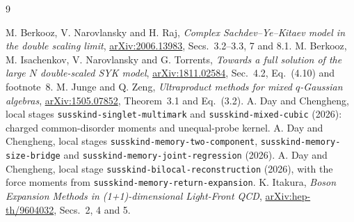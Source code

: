 \documentclass[11pt]{article}
\begin{document}
\begin{thebibliography}{9}\small\raggedright
{} M. Berkooz, V. Narovlansky and H. Raj,
\emph{Complex Sachdev--Ye--Kitaev model in the double scaling limit},
\href{https://arxiv.org/abs/2006.13983}{arXiv:2006.13983},
Secs.~3.2--3.3, 7 and 8.1.
 M. Berkooz, M. Isachenkov, V. Narovlansky and G. Torrents,
\emph{Towards a full solution of the large $N$ double-scaled SYK model},
\href{https://arxiv.org/abs/1811.02584}{arXiv:1811.02584},
Sec.~4.2, Eq.~(4.10) and footnote~8.
 M. Junge and Q. Zeng,
\emph{Ultraproduct methods for mixed $q$-Gaussian algebras},
\href{https://arxiv.org/abs/1505.07852}{arXiv:1505.07852},
Theorem~3.1 and Eq.~(3.2).
 A. Day and Chengheng, local stages
\texttt{susskind-singlet-multimark} and \texttt{susskind-mixed-cubic}
(2026): charged common-disorder moments and unequal-probe kernel.
 A. Day and Chengheng, local stages
\texttt{susskind-memory-two-component}, \texttt{susskind-memory-size-bridge}
and \texttt{susskind-memory-joint-regression} (2026).
 A. Day and Chengheng, local stage
\texttt{susskind-bilocal-reconstruction} (2026), with the force moments
from \texttt{susskind-memory-return-expansion}.
 K. Itakura,
\emph{Boson Expansion Methods in (1+1)-dimensional Light-Front QCD},
\href{https://arxiv.org/abs/hep-th/9604032}{arXiv:hep-th/9604032},
Secs.~2, 4 and 5.
\end{thebibliography}
\end{document}
